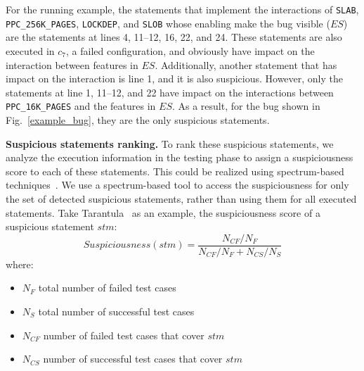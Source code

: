 For the running example, the statements that implement the
interactions of \texttt{SLAB}, \texttt{PPC\_256K\_PAGES},
\texttt{LOCKDEP}, and \texttt{\!SLOB} whose enabling make the bug
visible ($ES$) are the statements at lines 4, 11--12, 16, 22, and
24. These statements are also executed in $c_7$, a failed
configuration, and obviously have impact on the interaction between
features in $ES$.
%
Additionally, another statement that has impact on the interaction is
line 1, and it is also suspicious. However, only the statements at
line 1, 11--12, and 22 have impact on the interactions between
\texttt{PPC\_16K\_PAGES} and the features in $ES$. As a result, for
the bug shown in Fig.~\ref{example_bug}, they are the only suspicious
statements.

\textbf{Suspicious statements ranking.} To rank these suspicious
statements, we analyze the execution information in the testing phase
to assign a suspiciousness score to each of these statements. This
could be realized using spectrum-based
techniques~\cite{wong2009survey}. We use a spectrum-based
tool to access the suspiciousness for only the set of detected
suspicious statements, rather than using them for all executed
statements. Take Tarantula~\cite{tarantula} as an example, the
suspiciousness score of a suspicious statement $stm$:
$$
Suspiciousness(stm) = \frac{N_{CF}/N_F}{N_{CF}/N_F+N_{CS}/N_S}
$$
where:
\begin{itemize}
\item $N_F$ total number of failed test cases
\item $N_S$ total number of successful test cases
\item $N_{CF}$ number of failed test cases that cover $stm$
\item $N_{CS}$ number of successful test cases that cover $stm$
\end{itemize}
